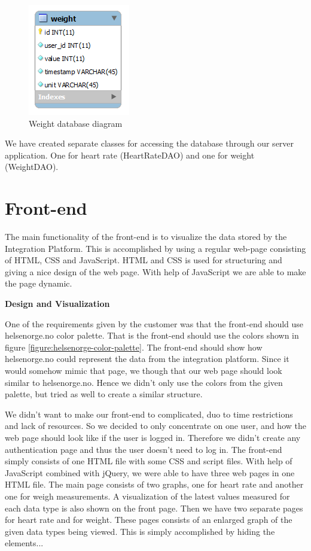 \begin{figure}[h]
\centering
\includegraphics[scale=1.0]{../Figures/weight-database-diagram.png}
\caption{Weight database diagram}
\label{figure:weight-database-diagram}
\end{figure}

We have created separate classes for accessing the database through our server application.
One for heart rate (HeartRateDAO) and one for weight (WeightDAO).


\section{Front-end}

The main functionality of the front-end is to visualize the data stored by the Integration Platform.
This is accomplished by using a regular web-page consisting of HTML, CSS and JavaScript. HTML and CSS is used for structuring and giving a nice design of the web page. With help of JavaScript we are able to make the page dynamic.

\textbf{Design and Visualization}

One of the requirements given by the customer was that the front-end should use helsenorge.no color palette. 
That is the front-end should use the colors shown in figure \ref{figure:helsenorge-color-palette}. 
The front-end should show how helsenorge.no could represent the data from the integration platform. 
Since it would somehow mimic that page, we though that our web page should look similar to helsenorge.no. 
Hence we didn't only use the colors from the given palette, but tried as well to create a similar structure.

We didn't want to make our front-end to complicated, duo to time restrictions and lack of resources. 
So we decided to only concentrate on one user, and how the web page should look like if the user is logged in. 
Therefore we didn't create any authentication page and thus the user doesn't need to log in. 
The front-end simply consists of one HTML file with some CSS and script files. With help of JavaScript combined with jQuery, we were able to have three web pages in one HTML file. 
The main page consists of two graphs, one for heart rate and another one for weigh measurements. 
A visualization of the latest values measured for each data type is also shown on the front page.
Then we have two separate pages for heart rate and for weight.
These pages consists of an enlarged graph of the given data types being viewed.
This is simply accomplished by hiding the elements...

